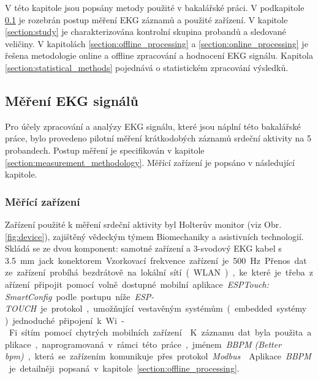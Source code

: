 V této kapitole jsou popsány metody použité v bakalářské práci. V podkapitole
\ref{section:measurement} je rozebrán postup měření EKG záznamů a použité
zařízení. V kapitole \ref{section:study} je charakterizována kontrolní skupina
probandů a sledované veličiny. V kapitolách \ref{section:offline_processing} a
\ref{section:online_processing} je řešena metodologie online a offline
zpracování a hodnocení EKG signálu. Kapitola \ref{section:statistical_methods}
pojednává o statistickém zpracování výsledků.

\subsection{Měření EKG signálů}
\label{section:measurement}
Pro účely zpracování a analýzy EKG signálu, které jsou náplní této bakalářské
práce, bylo provedeno pilotní měření krátkodobých záznamů srdeční aktivity na 5
probandech. Postup měření je specifikován v kapitole
\ref{section:measurement_methodology}. Měřící zařízení je popsáno v následující
kapitole.

\subsubsection{Měřící zařízení}
\label{section:measurement_device}
Zařízení použité k měření srdeční aktivity byl Holterův monitor (viz Obr.
\ref{fig:device}), zajištěný vědeckým týmem Biomechaniky a asistivních
technologií. Skládá se ze dvou komponent: samotné zařízení a 3-svodový EKG
kabel s 3.5~\si\mm~jack konektorem. Vzorkovací frekvence zařízení je 500 \si\Hz.

Přenos dat ze zařízení probíhá bezdrátově na lokální sítí (WLAN), ke které je
třeba zařízení připojit pomocí volně dostupné mobilní aplikace \textit{ESPTouch:
    SmartConfig} podle postupu níže. \textit{ESP-TOUCH} je protokol, umožňující
vestavěným systémům (embedded systémy) jednoduché připojení k Wi-Fi sítím pomocí
chytrých mobilních zařízení \cite{esptouch}. K záznamu dat byla použita
aplikace, naprogramovaná v rámci této práce, jménem \textit{BBPM (Better bpm)},
která se zařízením komunikuje přes protokol \textit{Modbus} \cite{modbus}.
Aplikace \textit{BBPM} je detailněji popsaná v kapitole
\ref{section:offline_processing}.

